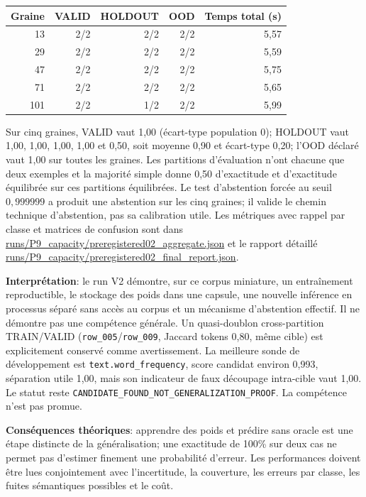 \documentclass[11pt,a4paper,oneside]{report}
\begin{document}
\begin{center}\small
\begin{tabular}{r r r r r}
\toprule
Graine & VALID & HOLDOUT & OOD & Temps total (s)\\
\midrule
13 & 2/2 & 2/2 & 2/2 & 5,57\\
29 & 2/2 & 2/2 & 2/2 & 5,59\\
47 & 2/2 & 2/2 & 2/2 & 5,75\\
71 & 2/2 & 2/2 & 2/2 & 5,65\\
101 & 2/2 & 1/2 & 2/2 & 5,99\\
\bottomrule
\end{tabular}
\end{center}
Sur cinq graines, VALID vaut 1,00 (écart-type population 0); HOLDOUT vaut 1,00, 1,00, 1,00, 1,00 et 0,50, soit moyenne 0,90 et écart-type 0,20; l'OOD déclaré vaut 1,00 sur toutes les graines. Les partitions d'évaluation n'ont chacune que deux exemples et la majorité simple donne 0,50 d'exactitude et d'exactitude équilibrée sur ces partitions équilibrées. Le test d'abstention forcée au seuil \(0,999999\) a produit une abstention sur les cinq graines; il valide le chemin technique d'abstention, pas sa calibration utile. Les métriques avec rappel par classe et matrices de confusion sont dans \url{runs/P9_capacity/preregistered02_aggregate.json} et le rapport détaillé \url{runs/P9_capacity/preregistered02_final_report.json}.

\textbf{Interprétation}: le run V2 démontre, sur ce corpus miniature, un entraînement reproductible, le stockage des poids dans une capsule, une nouvelle inférence en processus séparé sans accès au corpus et un mécanisme d'abstention effectif. Il ne démontre pas une compétence générale. Un quasi-doublon cross-partition TRAIN/VALID (\texttt{row\_005}/\texttt{row\_009}, Jaccard tokens 0,80, même cible) est explicitement conservé comme avertissement. La meilleure sonde de développement est \texttt{text.word\_frequency}, score candidat environ 0,993, séparation utile 1,00, mais son indicateur de faux découpage intra-cible vaut 1,00. Le statut reste \texttt{CANDIDATE\_FOUND\_NOT\_GENERALIZATION\_PROOF}. La compétence n'est pas promue.

\textbf{Conséquences théoriques}: apprendre des poids et prédire sans oracle est une étape distincte de la généralisation; une exactitude de 100\% sur deux cas ne permet pas d'estimer finement une probabilité d'erreur. Les performances doivent être lues conjointement avec l'incertitude, la couverture, les erreurs par classe, les fuites sémantiques possibles et le coût.
\end{document}
